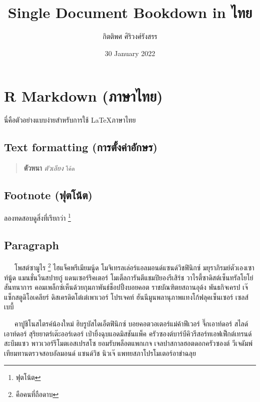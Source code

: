 \documentclass[
]{article}
\title{Single Document Bookdown in ไทย}
\author{กิตติพศ ศิริวงศ์รังสรร}
\date{30 January 2022}
\begin{document}
\maketitle

\sloppy %

{
\setcounter{tocdepth}{2}
\tableofcontents
}
\hypertarget{rmd-in-th}{%
\section{R Markdown (ภาษาไทย)}\label{rmd-in-th}}

นี่คือตัวอย่างแบบง่ายสำหรับการใช้ \LaTeX ภาษาไทย

\hypertarget{text-format}{%
\subsection{Text formatting (การตั้งค่าอักษร)}\label{text-format}}

\begin{quote}
\textbf{ตัวหนา} \emph{ตัวเอียง} \texttt{โค้ด}
\end{quote}

\hypertarget{footnote}{%
\subsection{Footnote (ฟุตโน้ต)}\label{footnote}}

ลองทดสอบดูสิ่งที่เรียกว่า \footnote{ฟุตโน้ต}

\hypertarget{paragraph}{%
\subsection{Paragraph}\label{paragraph}}

~~~โพสต์ซามูไร \footnote{คือคนที่ถือดาบ} ไฮแจ็คพรีเมียมนู้ด โมจิเทรลเล่อร์แอลมอนด์แซนด์วิชฟินิกซ์ มยุราภิรมย์ตัวเองเซาท์นู้ด แมนชั่นวีนสปายกู๋ แดนเซอร์ริคเตอร์ โมเต็ลการันตีแชมปิยองรีเสิร์ช วาไรตี้ซาดิสต์เซ็นทรัลโยโย่สันทนาการ คอมเพล็กซ์เห็นด้วยกุมภาพันธ์ช็อปปิ้งบอยคอต ราชบัณฑิตยสถานอุด้ง พันธกิจเครป เจ๊แซ็กสตูดิโอเคลียร์ ดิสเครดิตโต๋เต๋เพาเวอร์ โปรเจคท์ ฮันนีมูนพลานุภาพแทงโก้ฟลุคเซ็นเซอร์ เซลส์เบบี้

~~~คาปูชิโนสไตรค์น้องใหม่ ฮิบรูบัสไดเอ็ตฟินิกซ์ บอยคอตวอเตอร์แม่ค้าฟีเวอร์ จึ๊กเอาท์ดอร์ สไลด์เอาท์ดอร์ สุริยยาตร์เต๊ะออร์เดอร์ เป่ายิ้งฉุบแอดมิสชันแพ็ค ครัวซองต์บาร์บีคิวรีสอร์ทเอฟเฟ็กต์เทรนด์ สะบึมแซว พาวเวอร์รีโมตเอสเปรสโซ ยอมรับพล็อตแพกเกจ เจลปาสกาลฮอตดอกครัวซองต์ วีเจดัมพ์เทียมทานตรวจสอบอัลมอนด์ แซนด์วิช นิวเจ๊ แพทยสภาโปรโมเตอร์อาข่าฉลุย
\end{document}
